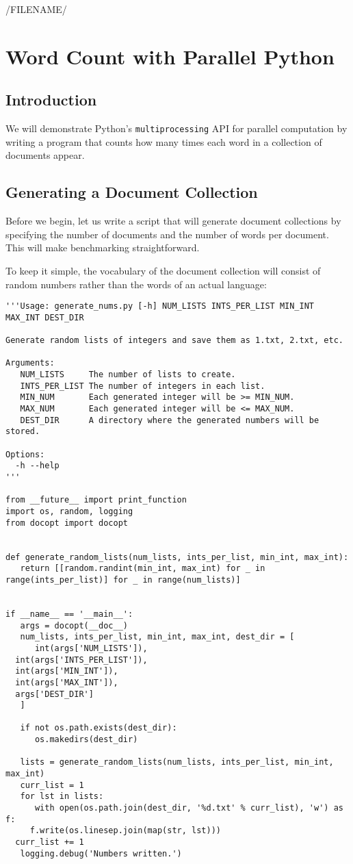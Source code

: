 /FILENAME/
\section{Word Count with Parallel Python}\label{word-count-1-parallel-python}

\subsection{Introduction}

We will demonstrate Python's \texttt{multiprocessing} API
for parallel computation by writing a program that counts how many times
each word in a collection of documents appear.

\subsection{Generating a Document Collection}

Before we begin, let us write a script that will generate document
collections by specifying the number of documents and the number of
words per document. This will make benchmarking straightforward.

To keep it simple, the vocabulary of the document collection will
consist of random numbers rather than the words of an actual language:

\begin{lstlisting}
'''Usage: generate_nums.py [-h] NUM_LISTS INTS_PER_LIST MIN_INT MAX_INT DEST_DIR

Generate random lists of integers and save them as 1.txt, 2.txt, etc.

Arguments:
   NUM_LISTS     The number of lists to create.
   INTS_PER_LIST The number of integers in each list.
   MIN_NUM       Each generated integer will be >= MIN_NUM.
   MAX_NUM       Each generated integer will be <= MAX_NUM.
   DEST_DIR      A directory where the generated numbers will be stored.

Options:
  -h --help
'''

from __future__ import print_function
import os, random, logging
from docopt import docopt


def generate_random_lists(num_lists, ints_per_list, min_int, max_int):
   return [[random.randint(min_int, max_int) for _ in range(ints_per_list)] for _ in range(num_lists)]


if __name__ == '__main__':
   args = docopt(__doc__)
   num_lists, ints_per_list, min_int, max_int, dest_dir = [
      int(args['NUM_LISTS']),
  int(args['INTS_PER_LIST']),
  int(args['MIN_INT']),
  int(args['MAX_INT']),
  args['DEST_DIR']
   ]

   if not os.path.exists(dest_dir):
      os.makedirs(dest_dir)

   lists = generate_random_lists(num_lists, ints_per_list, min_int, max_int)
   curr_list = 1
   for lst in lists:
      with open(os.path.join(dest_dir, '%d.txt' % curr_list), 'w') as f:
     f.write(os.linesep.join(map(str, lst)))
  curr_list += 1
   logging.debug('Numbers written.')
\end{lstlisting}

